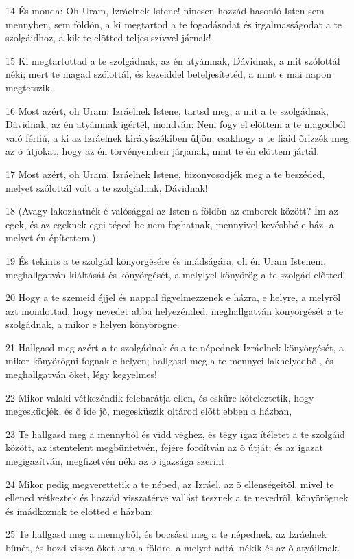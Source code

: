 \par 14 És monda: Oh Uram, Izráelnek Istene! nincsen hozzád hasonló Isten sem mennyben, sem földön, a ki megtartod a te fogadásodat és irgalmasságodat a te szolgáidhoz, a kik te elõtted teljes szívvel járnak!
\par 15 Ki megtartottad a te szolgádnak, az én atyámnak, Dávidnak, a mit szólottál néki; mert te magad szólottál, és kezeiddel beteljesítetéd, a mint e mai napon megtetszik.
\par 16 Most azért, oh Uram, Izráelnek Istene, tartsd meg, a mit a te szolgádnak, Dávidnak, az én atyámnak igértél, mondván: Nem fogy el elõttem a te magodból való férfiú, a ki az Izráelnek királyiszékiben üljön; csakhogy  a te fiaid õrizzék meg az õ útjokat, hogy az én törvényemben járjanak, mint te én elõttem jártál.
\par 17 Most azért, oh Uram, Izráelnek Istene, bizonyosodjék meg a te beszéded, melyet szólottál volt a te szolgádnak, Dávidnak!
\par 18 (Avagy lakozhatnék-é valósággal az Isten a földön az emberek között? Ím az egek, és az egeknek egei téged be nem foghatnak, mennyivel kevésbbé e ház, a melyet én építettem.)
\par 19 És tekints a te szolgád könyörgésére és imádságára, oh én Uram Istenem, meghallgatván kiáltását és könyörgését, a melylyel könyörög a te szolgád elõtted!
\par 20 Hogy a te szemeid éjjel és nappal figyelmezzenek e házra, e helyre, a melyrõl azt mondottad, hogy nevedet abba helyezénded, meghallgatván könyörgését a te szolgádnak, a mikor e helyen könyörögne.
\par 21 Hallgasd meg azért a te szolgádnak és a te népednek Izráelnek könyörgését, a mikor könyörögni fognak e helyen; hallgasd meg a te mennyei lakhelyedbõl, és meghallgatván õket, légy kegyelmes!
\par 22 Mikor valaki vétkezéndik felebarátja ellen, és esküre köteleztetik, hogy megesküdjék, és õ ide jõ, megesküszik oltárod elõtt ebben a házban,
\par 23 Te hallgasd meg a mennybõl és vidd véghez, és tégy igaz ítéletet a te szolgáid között, az istentelent megbüntetvén, fejére fordítván az õ útját; és az igazat megigazítván, megfizetvén néki az õ igazsága szerint.
\par 24 Mikor pedig megverettetik a te néped, az Izráel, az õ ellenségeitõl, mivel te ellened vétkeztek és hozzád visszatérve vallást tesznek a te nevedrõl, könyörögnek és imádkoznak te elõtted e házban:
\par 25 Te hallgasd meg a mennybõl, és bocsásd meg a te népednek, az Izráelnek bûnét, és hozd vissza õket arra a földre, a melyet adtál nékik és az õ atyáiknak.
